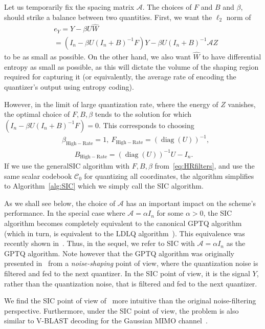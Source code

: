 \documentclass[journal]{IEEEtran}
\newcommand{\diag}{\mathop{\mathrm{diag}}}
\newcommand{\m}{\mathcal}
\newcommand{\HR}{\mathrm{High-Rate}}
\begin{document}
Let us temporarily fix the spacing matrix $\m{A}$. The choices of $F$ and $B$ and $\beta$, should strike a balance between two quantities. First, we want the $\ell_2$ norm of
\begin{align}
&e_Y=Y-\beta U\hat{W}\nonumber\\
&=\left(I_n-\beta U(I_n+B)^{-1}F\right)Y-\beta U(I_n+B)^{-1}\m{A} Z
\end{align}
to be as small as possible. On the other hand, we also want $\hat{W}$ to have differential entropy as small as possible, as this will dictate the volume of the shaping region required for capturing it (or equivalently, the average rate of encoding the quantizer's output using entropy coding).

However, in the limit of large quantization rate, where the energy of $Z$ vanishes, the optimal choice of $F,B,\beta$ tends to the solution for which $\left(I_n-\beta U(I_n+B)^{-1}F\right)=0$. This corresponds to choosing
\begin{align}
&\beta_{\HR}=1,~F_{\HR}=(\diag(U))^{-1},\nonumber\\
&~~~~~~~~B_{\HR}=(\diag(U))^{-1}U-I_n.
\label{eq:HRfilters}
\end{align}
If we use the generalSIC algorithm with $F,B,\beta$ from~\eqref{eq:HRfilters}, and use the same scalar codebook $\m{C}_0$ for quantizing all coordinates, the algorithm simplifies to Algorithm~\ref{alg:SIC} which we simply call the SIC algorithm.

As we shall see below, the choice of $\m{A}$ has an important impact on the scheme's performance.
In the special case where $\m{A}=\alpha I_n$ for some $\alpha>0$, the SIC algorithm becomes
completely equivalent to the canonical GPTQ algorithm (which in turn, is equivalent to the LDLQ
algorithm~\cite{chee2023quip}). This equivalence was recently shown
in~\cite{chen2025geometry,birnick2025lattice}. Thus, in the sequel, we refer to SIC with
$\m{A}=\alpha I_n$ as the GPTQ algorithm. Note however that the GPTQ algorithm was originally
presented in~\cite{frantar2023optq} from a \emph{noise-shaping} point of view, where the quantization
noise is filtered and fed to the next quantizer. In the SIC point of view, it is the signal $Y$, rather than the quantization noise, that is filtered and fed to the next quantizer. 

We find the SIC point of view of~\cite{chen2025geometry,birnick2025lattice} more intuitive than the original noise-filtering perspective. Furthermore, under the SIC point of view, the problem is also similar to V-BLAST decoding for the Gaussian MIMO channel~\cite{wolniansky1998v}.
\end{document}
